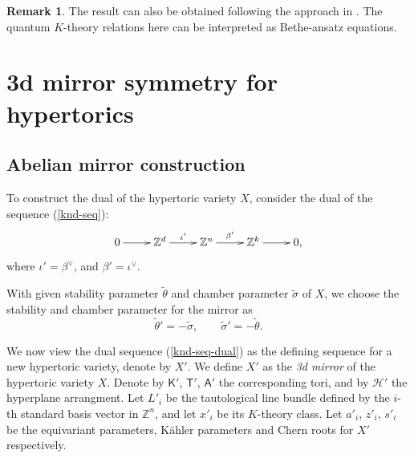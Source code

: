 \documentclass[10pt]{amsart}
\theoremstyle{definition}
\def\ZZ{{\mathbb{Z}}}
\newcommand{\cH}{\mathcal{H}}
\newcommand{\bA}{\mathsf{A}}
\newcommand{\bT}{\mathsf{T}}
\newcommand{\bK}{\mathsf{K}}
\theoremstyle{definition}
\newtheorem{Remark}[Definition]{Remark}
\numberwithin{equation}{section}
\theoremstyle{Theorem}
\begin{document}
\begin{Remark}
The result can also be obtained following the approach in \cite{PSZ}. The quantum $K$-theory relations here can be interpreted as Bethe-ansatz equations.
\end{Remark}
















\vspace{3ex}

\section{3d mirror symmetry for hypertorics}

\subsection{Abelian mirror construction}

To construct the dual of the hypertoric variety $X$, consider the dual of the sequence (\ref{knd-seq}):
\begin{equation} \label{knd-seq-dual}
\xymatrix{
	0 \ar[r] & \ZZ^d \ar[r]^{\iota'} & \ZZ^n \ar[r]^{\beta'} & \ZZ^k \ar[r] & 0,
}
\end{equation}
where $\iota' = \beta^\vee$, and $\beta' = \iota^\vee$.

With given stability parameter $\widetilde\theta$ and chamber parameter $\widetilde\sigma$ of $X$, we choose the stability and chamber parameter for the mirror as
\begin{equation} \label{mirror-theta-sigma}
\widetilde\theta' = - \widetilde\sigma, \qquad \widetilde\sigma' = - \widetilde\theta.
\end{equation}

We now view the dual sequence (\ref{knd-seq-dual}) as the defining sequence for a new hypertoric variety, denote by $X'$.  We define $X'$ as the \emph{3d mirror} of the hypertoric variety $X$. Denote by $\bK'$, $\bT'$, $\bA'$ the corresponding tori, and by $\cH'$ the hyperplane arrangment. Let $L'_i$ be the tautological line bundle defined by the $i$-th standard basis vector in $\ZZ^n$, and let $x'_i$ be its $K$-theory class. Let $a'_i$, $z'_i$, $s'_i$ be the equivariant parameters, K\"ahler parameters and Chern roots for $X'$ respectively.
\end{document}
